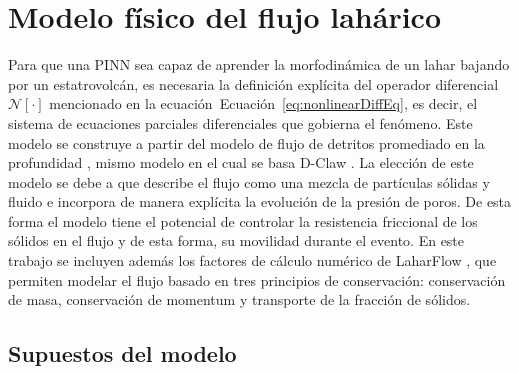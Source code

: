 \section{Modelo físico del flujo lahárico}
\label{sec:modelo_fisico}

Para que una PINN sea capaz de aprender la morfodinámica de un lahar bajando por un estatrovolcán, es necesaria la definición explícita del operador diferencial $\mathcal{N}[\cdot]$ mencionado en la ecuación~Ecuación~\eqref{eq:nonlinearDiffEq},
es decir, el sistema de ecuaciones parciales diferenciales que gobierna el fenómeno. Este modelo se construye a partir del modelo de flujo de detritos promediado en la profundidad \cite{iverson2014depth,george2014depth}, mismo modelo en el cual
se basa D-Claw \cite{george2025d}. La elección de este modelo se debe a que describe el flujo como una mezcla de partículas sólidas y fluido e incorpora de manera explícita la evolución de la presión de poros.
De esta forma el modelo tiene el potencial de controlar la resistencia friccional de los sólidos en el flujo y de esta forma, su movilidad durante el evento. En este trabajo se incluyen además los factores de cálculo numérico de LaharFlow \cite{woodhouseshallow},
que permiten modelar el flujo basado en tres principios de conservación: conservación de masa, conservación de momentum y transporte de la fracción de sólidos. 
\subsection{Supuestos del modelo}
\label{subsec:supuestos}

